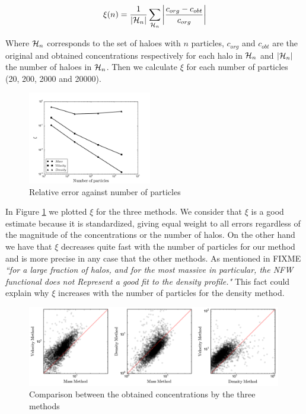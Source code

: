\documentclass[useAMS,usenatbib]{mn2e}
\begin{document}
\begin{equation}
\xi(n)=\frac{1}{\left|{\cal{H}}_n\right|}\sum_{{\cal{H}}_n}\left|\frac{c_{org}-c_{obt}}{c_{org}}\right|
\end{equation}

Where ${\cal{H}}_n$ corresponds to the set of haloes with $n$ particles, $c_{org}$ and $c_{obt}$ are the original and obtained concentrations respectively for each halo in ${\cal{H}}_n$ and $\left|{\cal{H}}_n\right|$ the number of haloes in ${\cal{H}}_n$. Then we calculate $\xi$ for each number of particles (20, 200, 2000 and 20000).

\begin{figure}
\begin{center}
  \includegraphics[width=0.48\textwidth]{error.pdf}
\end{center}
\caption{Relative error against number of particles
    \label{fig:error}}
\end{figure}

In Figure \ref{fig:error} we plotted $\xi$ for the three methods. We consider that $\xi$ is a good estimate because it is standardized, giving equal weight to all errors regardless of the magnitude of the concentrations or the number of halos. On the other hand we have that $\xi$ decreases quite fast with the number of particles for our method and is more precise in any case that the other methods. As mentioned in FIXME \textit{``for a large fraction of halos, and for the most massive in particular, the NFW functional does not Represent a good fit to the density profile."} This fact could explain why $\xi$ increases with the number of particles for the density method.

\begin{figure}
\begin{center}
  \includegraphics[width=0.99\textwidth]{mass-density-velocity.pdf}
\end{center}
\caption{Comparison between the obtained concentrations by the three methods
    \label{fig:mdv}}
\end{figure}
\end{document}
